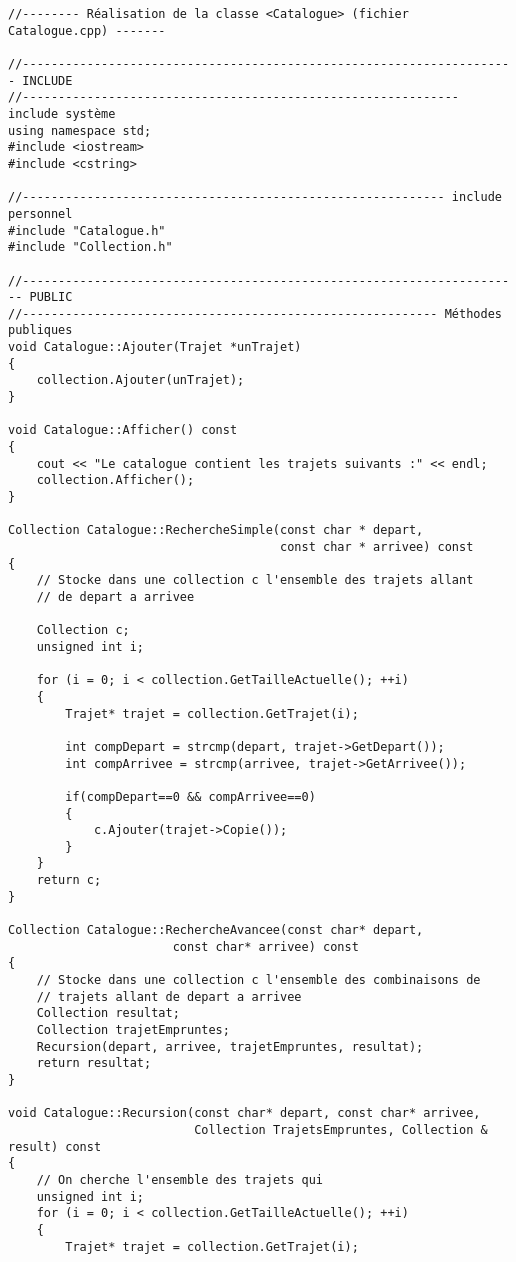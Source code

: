 \begin{verbatim}
//-------- Réalisation de la classe <Catalogue> (fichier Catalogue.cpp) -------

//--------------------------------------------------------------------- INCLUDE
//------------------------------------------------------------- include système
using namespace std;
#include <iostream>
#include <cstring>

//----------------------------------------------------------- include personnel
#include "Catalogue.h"
#include "Collection.h"

//---------------------------------------------------------------------- PUBLIC
//---------------------------------------------------------- Méthodes publiques
void Catalogue::Ajouter(Trajet *unTrajet)
{
    collection.Ajouter(unTrajet);
}

void Catalogue::Afficher() const
{
    cout << "Le catalogue contient les trajets suivants :" << endl;
    collection.Afficher();
}

Collection Catalogue::RechercheSimple(const char * depart,
                                      const char * arrivee) const
{
    // Stocke dans une collection c l'ensemble des trajets allant
    // de depart a arrivee
    
    Collection c;
    unsigned int i;
    
    for (i = 0; i < collection.GetTailleActuelle(); ++i)
    {
        Trajet* trajet = collection.GetTrajet(i);
        
        int compDepart = strcmp(depart, trajet->GetDepart());
        int compArrivee = strcmp(arrivee, trajet->GetArrivee());
        
        if(compDepart==0 && compArrivee==0)
        {
            c.Ajouter(trajet->Copie());
        }
    }
    return c;
}

Collection Catalogue::RechercheAvancee(const char* depart,
                       const char* arrivee) const
{
    // Stocke dans une collection c l'ensemble des combinaisons de
    // trajets allant de depart a arrivee
    Collection resultat;
    Collection trajetEmpruntes;
    Recursion(depart, arrivee, trajetEmpruntes, resultat);
    return resultat;
}

void Catalogue::Recursion(const char* depart, const char* arrivee,
                          Collection TrajetsEmpruntes, Collection & result) const
{
    // On cherche l'ensemble des trajets qui
    unsigned int i;
    for (i = 0; i < collection.GetTailleActuelle(); ++i)
    {
        Trajet* trajet = collection.GetTrajet(i);
        

\end{verbatim}
